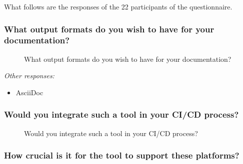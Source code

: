 What follows are the responses of the 22 participants of the questionnaire.

\subsubsection*{What output formats do you wish to have for your documentation?}

\begin{figure}[H]
    \centering
    \label{fig:qOutputFormats}
    \caption{What output formats do you wish to have for your documentation?}
\end{figure}

\textit{Other responses:}
\begin{itemize}
    \item AsciiDoc
\end{itemize}

\subsubsection*{Would you integrate such a tool in your CI/CD process?}

\begin{figure}[H]
    \centering
    \caption{Would you integrate such a tool in your CI/CD process?}
\end{figure}

\subsubsection*{How crucial is it for the tool to support these platforms?}

